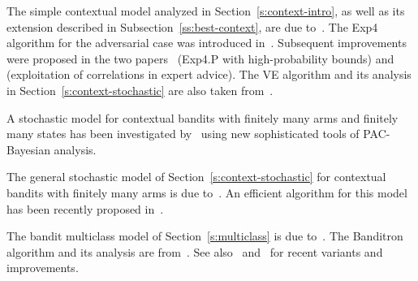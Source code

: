 \documentclass[11pt]{hackednow}
\begin{document}
The simple contextual model analyzed in Section~\ref{s:context-intro}, as well as its extension described in Subsection~\ref{ss:best-context}, are due to~\cite{maillard2011adaptive}. The Exp4 algorithm for the adversarial case was introduced in~\cite{ACFS03}. Subsequent improvements were proposed in the two papers~\cite{beygelzimer2011contextual} (Exp4.P with high-probability bounds) and~\cite{mcmahan2009tighter} (exploitation of correlations in expert advice). The VE algorithm and its analysis in Section~\ref{s:context-stochastic} are also taken from~\cite{beygelzimer2011contextual}.

A stochastic model for contextual bandits with finitely many arms and finitely many states has been investigated by~\cite{NIPS2011_0948} using new sophisticated tools of PAC-Bayesian analysis.

The general stochastic model of Section~\ref{s:context-stochastic} for contextual bandits with finitely many arms is due to~\cite{langford2007epoch}. An efficient algorithm for this model has been recently proposed in~\cite{dudik2011efficient}.

The bandit multiclass model of Section~\ref{s:multiclass} is due to~\cite{langford2007epoch}. The Banditron algorithm and its analysis are from~\cite{kakade2008efficient}. See also~\cite{crammer2011multiclass} and~\cite{hazan2011newtron} for recent variants and improvements.

 
\end{document}
